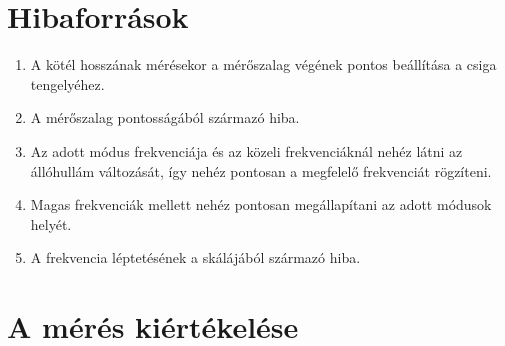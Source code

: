 \documentclass[10pt,pdftex]{report}
\begin{document}
\section*{Hibaforrások}
\begin{enumerate}
    \item{A kötél hosszának mérésekor a mérőszalag végének pontos beállítása a csiga tengelyéhez.}
    \item{A mérőszalag pontosságából származó hiba.}
    \item{Az adott módus frekvenciája és az közeli frekvenciáknál nehéz látni az állóhullám változását, így nehéz pontosan a megfelelő frekvenciát rögzíteni.}
    \item{Magas frekvenciák mellett nehéz pontosan megállapítani az adott módusok helyét.}
    \item{A frekvencia léptetésének a skálájából származó hiba.}
\end{enumerate}
\section*{A mérés kiértékelése}
\end{document}
